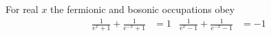 \documentclass{article}
\begin{document}
For real $x$ the fermionic and bosonic occupations obey
\begin{align}
\frac{1}{e^{x}+1} + \frac{1}{e^{-x}+1} &= 1 &
\frac{1}{e^{x}-1} + \frac{1}{e^{-x}-1} &= -1
\label{eq:pair}
\end{align}
\end{document}
